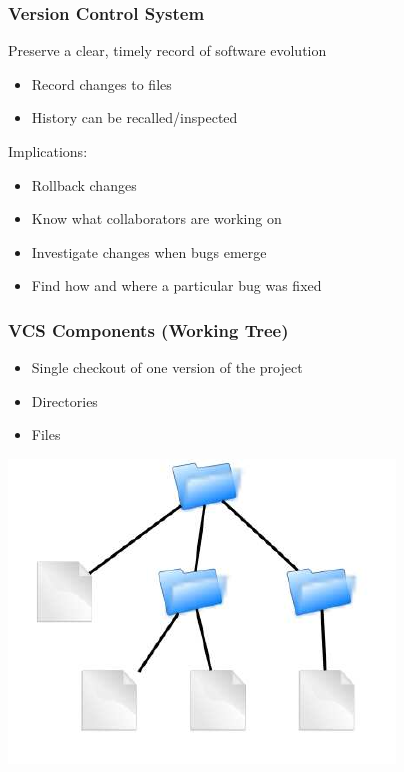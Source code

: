 \documentclass[english,compress]{beamer}
\begin{document}
\frame
{
    \frametitle{Version Control System}

        Preserve a clear, timely record of software evolution
            \begin{itemize}
                \item Record changes to files
                \item History can be recalled/inspected
            \end{itemize}
        Implications:
            \begin{itemize}
                \item Rollback changes
                \item Know what collaborators are working on
                \item Investigate changes when bugs emerge
                \item Find how and where a particular bug was fixed
            \end{itemize}
}

\frame
{
    \frametitle{VCS Components (Working Tree)}

    \begin{itemize}
        \item Single checkout of one version of the project
        \item Directories
        \item Files
    \end{itemize}
    \begin{center}
        \includegraphics[height=.3\textwidth]{figs/working-tree.png}
    \end{center}
}
\end{document}
